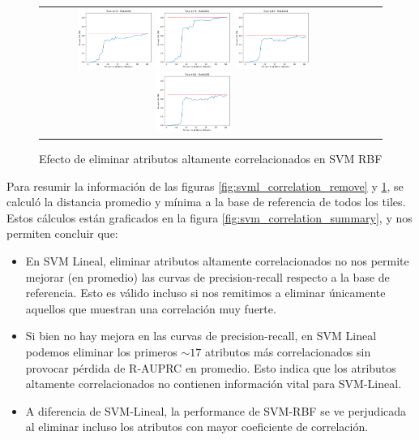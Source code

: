 \begin{figure}[h!]
\begin{tabular}{cccc}
\includegraphics[width=0.25\textwidth]{Kap6/pearson_rbf_INDIVIDUAL_CURVES_train=b278test=b234}  \includegraphics[width=0.25\textwidth]{Kap6/pearson_rbf_INDIVIDUAL_CURVES_train=b278test=b261} 
 \includegraphics[width=0.25\textwidth]{Kap6/pearson_rbf_INDIVIDUAL_CURVES_train=b360test=b234}  \includegraphics[width=0.25\textwidth]{Kap6/pearson_rbf_INDIVIDUAL_CURVES_train=b360test=b278} 
\end{tabular}
\caption{Efecto de eliminar atributos altamente correlacionados en SVM RBF}
\label{fig:svmk_correlation_remove}
\end{figure}

Para resumir la información de las figuras \ref{fig:svml_correlation_remove} y \ref{fig:svmk_correlation_remove}, se calculó la distancia promedio y mínima a la base de referencia de todos los tiles. Estos cálculos están graficados en la figura \ref{fig:svm_correlation_summary}, y nos permiten concluir que:

\begin{itemize}
\item  En SVM Lineal, eliminar atributos altamente correlacionados no nos permite mejorar (en promedio) las curvas de precision-recall respecto a la base de referencia. Esto es válido incluso si nos remitimos a eliminar únicamente aquellos que muestran una correlación muy fuerte.
\item Si bien no hay mejora en las curvas de precision-recall, en SVM Lineal podemos eliminar los primeros $\sim17$ atributos más correlacionados sin provocar pérdida de R-AUPRC en promedio. Esto indica que los atributos altamente correlacionados no contienen información vital para SVM-Lineal.
\item A diferencia de SVM-Lineal, la performance de SVM-RBF se ve perjudicada al eliminar incluso los atributos con mayor coeficiente de correlación. 
\end{itemize}

